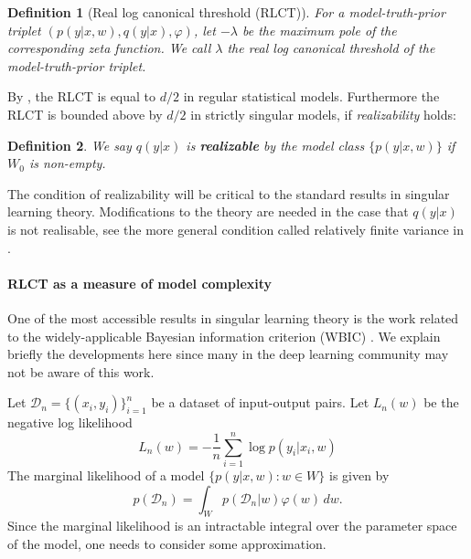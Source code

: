 \documentclass{article} %
\newtheorem{definition}{Definition}
\begin{document}
\begin{definition}[Real log canonical threshold (RLCT)]
For a model-truth-prior triplet $(p(y|x,w),q(y|x),\varphi)$, let $-\lambda$ be the maximum pole of the corresponding zeta function. We call $\lambda$ the real log canonical threshold of the model-truth-prior triplet.
\label{def:RLCT}
\end{definition}

By {\citet[Theorem 6.4]{watanabe_algebraic_2009}}, the RLCT is equal to $d/2$ in regular statistical models. Furthermore the RLCT is bounded above by $d/2$ in strictly singular models, if \textit{realizability} holds:
 \begin{definition}
	We say $q(y|x)$ is \textbf{realizable} by the model class $\{p(y|x,w)\}$ if $W_0$ is non-empty.
\end{definition}
The condition of realizability will be critical to the standard results in singular learning theory. Modifications to the theory are needed in the case that $q(y|x)$ is not realisable, see the more general condition called relatively finite variance in \citet{watanabe_mathematical_2018}.

\paragraph{RLCT as a measure of model complexity}
One of the most accessible results in singular learning theory is the work related to the widely-applicable Bayesian information criterion (WBIC) \citet{watanabe_widely_2013}. We explain briefly the developments here since many in the deep learning community may not be aware of this work.

Let $\mathcal D_n =  \{(x_i,y_i)\}_{i=1}^n$ be a dataset of input-output pairs.  
Let $L_n(w)$ be the negative log likelihood
\begin{equation}
L_n(w) = -\frac{1}{n} \sum_{i=1}^n \log p(y_i |x_i, w)
\label{eq:nll}
\end{equation}
The marginal likelihood of a model $\{p(y|x,w): w \in W\}$ is given by
$$
p(\mathcal D_n) = \int_W p(\mathcal D_n|w) \varphi(w) \,dw.
$$
Since the marginal likelihood is an intractable integral over the parameter space of the model, one needs to consider some approximation.
\end{document}
